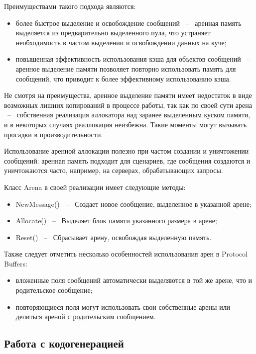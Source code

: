 Преимуществами такого подхода являются:
\begin{itemize}
    \item более быстрое выделение и освобождение сообщений ~--~ аренная память выделяется из предварительно выделенного пула, что устраняет необходимость в частом выделении и освобождении данных на куче;
    \item повышенная эффективность использования кэша для объектов сообщений ~--~ аренное выделение памяти позволяет повторно использовать память для сообщений, что приводит к более эффективному использованию кэша.
\end{itemize}

Не смотря на преимущества, аренное выделение памяти имеет недостаток в виде возможных лишних копирований в процессе работы, так как по своей сути арена ~--~ собственная реализация аллокатора над заранее выделенным куском памяти, и в некоторых случаях реаллокация неизбежна. Такие моменты могут вызывать просадки в производительности.

Использование аренной аллокации полезно при частом создании и уничтожении сообщений: аренная память подходит для сценариев, где сообщения создаются и уничтожаются часто, например, на серверах, обрабатывающих запросы.

Класс Arena в своей реализации имеет следующие методы:
\begin{itemize}
    \item NewMessage() ~--~ Создает новое сообщение, выделенное в указанной арене;
    \item Allocate() ~--~ Выделяет блок памяти указанного размера в арене;
    \item Reset() ~--~ Сбрасывает арену, освобождая выделенную память.
\end{itemize}

Также следует отметить несколько особенностей использования арен в Protocol Buffers:

\begin{itemize}
    \item вложенные поля сообщений автоматически выделяются в той же арене, что и родительское сообщение;
    \item повторяющиеся поля могут использовать свои собственные арены или делиться ареной с родительским сообщением.
\end{itemize}

\subsection{Работа с кодогенерацией}

